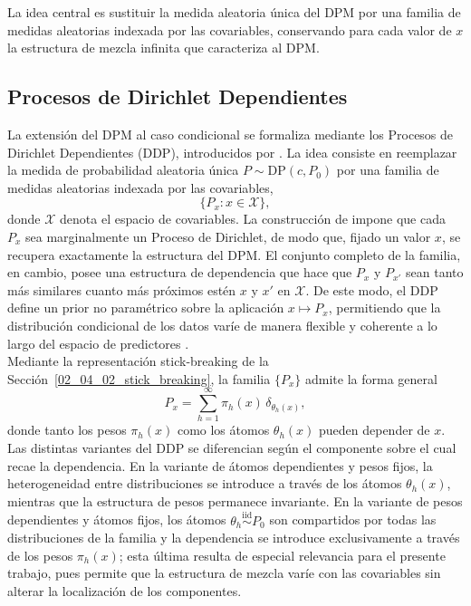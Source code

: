 La idea central es sustituir la medida aleatoria única del DPM por una familia de medidas aleatorias indexada por las covariables, conservando para cada valor de $x$ la estructura de mezcla infinita que caracteriza al DPM.
\subsection{Procesos de Dirichlet Dependientes}
\label{02_06_01_ddp}
La extensión del DPM al caso condicional se formaliza mediante los Procesos de Dirichlet Dependientes (DDP), introducidos por \citet{02_06_maceachern1999dependent}. La idea consiste en reemplazar la medida de probabilidad aleatoria única $P \sim \mathrm{DP}(c, P_0)$ por una familia de medidas aleatorias indexada por las covariables,
\begin{equation}
    \{P_x : x \in \mathcal{X}\},
\end{equation}
donde $\mathcal{X}$ denota el espacio de covariables. La construcción de \citet{02_06_maceachern1999dependent} impone que cada $P_x$ sea marginalmente un Proceso de Dirichlet, de modo que, fijado un valor $x$, se recupera exactamente la estructura del DPM. El conjunto completo de la familia, en cambio, posee una estructura de dependencia que hace que $P_x$ y $P_{x'}$ sean tanto más similares cuanto más próximos estén $x$ y $x'$ en $\mathcal{X}$. De este modo, el DDP define un prior no paramétrico sobre la aplicación $x \mapsto P_x$, permitiendo que la distribución condicional de los datos varíe de manera flexible y coherente a lo largo del espacio de predictores \citep{02_06_maceachern1999dependent}.\\

Mediante la representación stick-breaking de la Sección~\ref{02_04_02_stick_breaking}, la familia $\{P_x\}$ admite la forma general
\begin{equation}\label{eq:ddp_general}
    P_x = \sum_{h=1}^{\infty} \pi_h(x)\, \delta_{\theta_h(x)},
\end{equation}
donde tanto los pesos $\pi_h(x)$ como los átomos $\theta_h(x)$ pueden depender de $x$.\\

Las distintas variantes del DDP se diferencian según el componente sobre el cual recae la dependencia. En la variante de átomos dependientes y pesos fijos, la heterogeneidad entre distribuciones se introduce a través de los átomos $\theta_h(x)$, mientras que la estructura de pesos permanece invariante. En la variante de pesos dependientes y átomos fijos, los átomos $\theta_h \overset{\mathrm{iid}}{\sim} P_0$ son compartidos por todas las distribuciones de la familia y la dependencia se introduce exclusivamente a través de los pesos $\pi_h(x)$; esta última resulta de especial relevancia para el presente trabajo, pues permite que la estructura de mezcla varíe con las covariables sin alterar la localización de los componentes.\\

